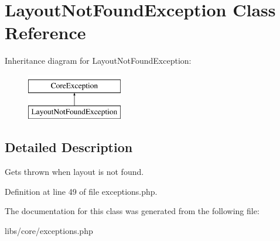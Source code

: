 \hypertarget{class_layout_not_found_exception}{\section{\-Layout\-Not\-Found\-Exception \-Class \-Reference}
\label{class_layout_not_found_exception}
}
\-Inheritance diagram for \-Layout\-Not\-Found\-Exception\-:\begin{figure}[H]
\begin{center}
\leavevmode
\includegraphics[height=2.000000cm]{class_layout_not_found_exception}
\end{center}
\end{figure}


\subsection{\-Detailed \-Description}
\-Gets thrown when layout is not found. 

\-Definition at line 49 of file exceptions.\-php.



\-The documentation for this class was generated from the following file\-:\begin{DoxyCompactItemize}
\item 
libs/core/exceptions.\-php\end{DoxyCompactItemize}
